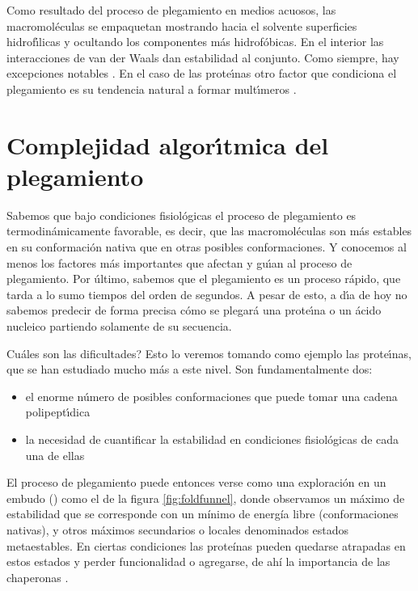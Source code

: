 Como resultado del proceso de plegamiento en medios acuosos, las macromol\'{e}culas se empaquetan mostrando 
hacia el solvente superficies hidrof\'\i{}licas y ocultando los componentes m\'{a}s hidrof\'{o}bicas. En el interior
las interacciones de van der Waals dan estabilidad al conjunto. Como siempre, hay excepciones notables \citep{Sun2014}.
En el caso de las prote\'\i{}nas otro factor que condiciona el plegamiento es su tendencia natural a formar 
mult\'\i{}meros \citep{Garcia2017}. 

\section{Complejidad algor\'\i{}tmica del plegamiento} \label{complejidad}

Sabemos que bajo condiciones fisiol\'{o}gicas el proceso de plegamiento es termodin\'{a}micamente
favorable, es decir, que las macromol\'{e}culas son m\'{a}s estables en su conformaci\'{o}n nativa que en
otras posibles conformaciones. Y conocemos al menos los factores m\'{a}s importantes que afectan
y gu\'\i{}an al proceso de plegamiento. Por \'{u}ltimo, sabemos que el plegamiento es un proceso r\'{a}pido,
que tarda a lo sumo tiempos del orden de segundos. A pesar de esto, a d\'\i{}a de hoy no sabemos 
predecir de forma precisa c\'{o}mo se plegar\'{a} una prote\'\i{}na o un \'{a}cido nucleico partiendo solamente 
de su secuencia. 

Cu\'{a}les son las dificultades? Esto lo veremos tomando como ejemplo las prote\'\i{}nas, que se han estudiado
mucho m\'{a}s a este nivel. Son fundamentalmente dos:
\begin{itemize}
\item el enorme n\'{u}mero de posibles conformaciones que puede tomar una cadena polipept\'\i{}dica
\item la necesidad de cuantificar la estabilidad en  condiciones fisiol\'{o}gicas de cada una de ellas
\end{itemize}

El proceso de plegamiento puede entonces verse como una exploraci\'{o}n en un embudo () como el de la figura
\ref{fig:foldfunnel}, donde observamos un m\'{a}ximo de estabilidad que se corresponde con un m\'{i}nimo de energ\'{i}a libre
(conformaciones nativas), y otros m\'{a}ximos secundarios o locales denominados estados metaestables. En ciertas condiciones
las prote\'{i}nas pueden quedarse atrapadas en estos estados y perder funcionalidad o agregarse, 
de ah\'{i} la importancia de las chaperonas \citep{pascual_garcia_alberto_2014_1066348}.


